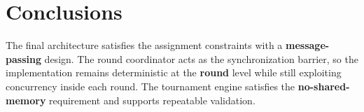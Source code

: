 \section{Conclusions}

The final architecture satisfies the assignment constraints with a \textbf{message-passing} design.
The round coordinator acts as the synchronization barrier, so the implementation remains deterministic at the
\textbf{round} level while still exploiting concurrency inside each round.
The tournament engine satisfies the \textbf{no-shared-memory} requirement and supports repeatable validation.
